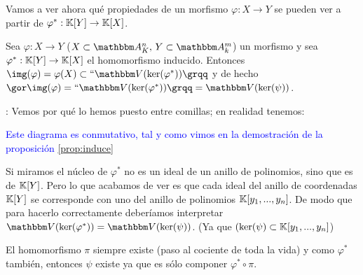 Vamos a ver ahora qué propiedades de un morfismo $\varphi: X \rightarrow Y$ se pueden ver a partir de $\varphi^*: \mathbb{K}[Y] \rightarrow \mathbb{K}[X]$.

\begin{lemma}[Clave]\label{lema:morf}
	Sea  $\varphi: X \rightarrow Y$ ($X  \subset \Akn,\, Y \subset \A_k^m$) un morfismo y sea $\varphi^*:\mathbb{K}[Y] \rightarrow \mathbb{K}[X]$ el homomorfismo inducido. Entonces $\img(\varphi)=\varphi(X) \subset ``\V(\ker (\varphi^*))\grqq$ y de hecho $\cls{\img(\varphi)}=``\V(\ker(\varphi^*))\grqq=\V(\ker(\psi))$.
\end{lemma}

	\notacion: Vemos por qué lo hemos puesto entre comillas; en realidad tenemos:


	
	\textcolor{blue}{Este diagrama es conmutativo, tal y como vimos en la demostración de la proposición \ref{prop:induce}}
	




	Si miramos el núcleo de $\varphi^*$ no es un ideal de un anillo de polinomios, sino que es de $\mathbb{K}[Y]$. Pero lo que acabamos de ver es que cada ideal del anillo de coordenadas $\mathbb{K}[Y]$ se corresponde con uno del anillo de polinomios $\mathbb{K}[y_1,...,y_n]$. De modo que para hacerlo correctamente deberíamos interpretar $\V(\ker(\varphi^*))= \V(\ker(\psi))$. (Ya que $(\ker(\psi) \subset \mathbb{K}[y_1,...,y_n]$)

	El homomorfismo $\pi$ siempre existe (paso al cociente de toda la vida) y como $\varphi^*$ también, entonces $\psi$ existe ya que es sólo componer $\varphi^* \circ \pi$.

